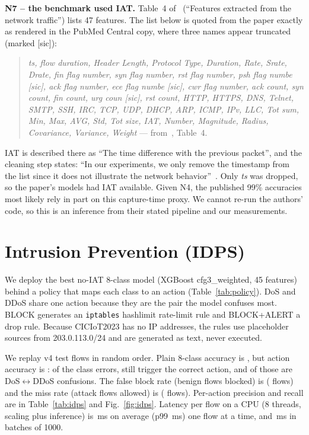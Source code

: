 \documentclass[conference]{IEEEtran}
\begin{document}
\textbf{N7 -- the benchmark used IAT.} Table~4 of~\cite{neto2023ciciot} (``Features extracted from the network
traffic'') lists 47 features. The list below is quoted from the paper exactly as rendered in the PubMed Central copy,
where three names appear truncated (marked [sic]):
\begin{quote}\footnotesize
\emph{ts, flow duration, Header Length, Protocol Type, Duration, Rate, Srate, Drate, fin flag number, syn
flag number, rst flag number, psh flag numbe [sic], ack flag number, ece flag numbe [sic], cwr flag number, ack count,
syn count, fin count, urg coun [sic], rst count, HTTP, HTTPS, DNS, Telnet, SMTP, SSH, IRC, TCP, UDP, DHCP, ARP,
ICMP, IPv, LLC, Tot sum, Min, Max, AVG, Std, Tot size, IAT, Number, Magnitude, Radius, Covariance,
Variance, Weight} --- from~\cite{neto2023ciciot}, Table~4.
\end{quote}
IAT is described there as ``The time difference with the previous packet'', and the cleaning step states: ``In
our experiments, we only remove the timestamp from the list since it does not illustrate the network
behavior''~\cite{neto2023ciciot}. Only \emph{ts} was dropped, so the paper's models had IAT available. Given N4,
the published 99\% accuracies most likely rely in part on this capture-time proxy. We cannot re-run the
authors' code, so this is an inference from their stated pipeline and our measurements.

\section{Intrusion Prevention (IDPS)}
We deploy the best no-IAT 8-class model (XGBoost cfg3\_weighted, 45 features) behind a policy that maps each
class to an action (Table~\ref{tab:policy}). DoS and DDoS share one action because they are the pair the
model confuses most. BLOCK generates an \texttt{iptables} hashlimit rate-limit rule and BLOCK+ALERT a drop
rule. Because CICIoT2023 has no IP addresses, the rules use placeholder sources from 203.0.113.0/24 and are
generated as text, never executed.



We replay \idsRows{} v4 test flows in random order. Plain 8-class accuracy is \idsEightAcc{}, but action
accuracy is \idsActAcc{}: of the \idsErr{} class errors, \idsAbsorbed{} still trigger the correct action, and
\idsAbsorbedDd{} of those are DoS$\leftrightarrow$DDoS confusions. The false block rate (benign flows blocked)
is \idsFalseBlock{} (\idsFalseBlockN{} flows) and the miss rate (attack flows allowed) is \idsMiss{}
(\idsMissN{} flows). Per-action precision and recall are in Table~\ref{tab:idps} and Fig.~\ref{fig:idps}.
Latency per flow on a CPU (8 threads, scaling plus inference) is \idsLatSingle{}\,ms on average (p99
\idsLatSingleP{}\,ms) one flow at a time, and \idsLatBatch{}\,ms in batches of 1000.
\end{document}
